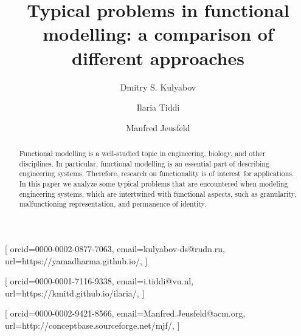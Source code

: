 \documentclass[
]{ceurart}
\begin{document}


\title{Typical problems in functional modelling: a comparison of different approaches}

\tnotemark[1]

\author[1,2]{Dmitry S. Kulyabov}[%
orcid=0000-0002-0877-7063,
email=kulyabov-ds@rudn.ru,
url=https://yamadharma.github.io/,
]
\cormark[1]
\fnmark[1]
\address[1]{ISTC-CNR Laboratory for Applied Ontology, via alla cascata 56/C, 38123, Povo, Italy}
\address[2]{Adige S.P.A, via per Barco, 11, Levico Terme, 38056, Italy}

\author[1]{Ilaria Tiddi}[%
orcid=0000-0001-7116-9338,
email=i.tiddi@vu.nl,
url=https://kmitd.github.io/ilaria/,
]
\fnmark[1]

\author[1]{Manfred Jeusfeld}[%
orcid=0000-0002-9421-8566,
email=Manfred.Jeusfeld@acm.org,
url=http://conceptbase.sourceforge.net/mjf/,
]
\fnmark[1]


\begin{abstract}
  Functional modelling is a well-studied topic in engineering, biology, and other disciplines. 
  In particular, functional modelling is an essential part of describing engineering systems.
  Therefore, research on functionality is of interest for applications.
  In this paper we analyze some typical problems that are encountered when modeling engineering systems, which are intertwined with functional aspects, such as granularity, malfunctioning representation, and permanence of identity.
\end{abstract}
\end{document}
